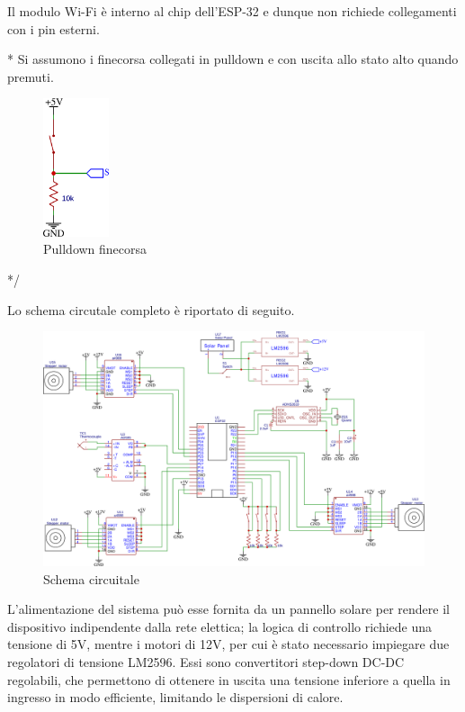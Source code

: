 \documentclass[12pt]{article}
\begin{document}
Il modulo Wi-Fi è interno al chip dell'ESP-32 e dunque non richiede collegamenti con i pin esterni.

\/*
Si assumono i finecorsa collegati in pulldown e con uscita allo stato alto quando premuti.\\

\begin{figure}[h]
\centering
    \includegraphics[width=55pt]{Draws/Pull_down.png}
    \caption{Pulldown finecorsa}
\end{figure}
*/

Lo schema circutale completo è riportato di seguito.
\begin{figure}[h]
\centering
    \includegraphics[width=\textwidth]{Draws/Schematic.png}
    \caption{Schema circuitale}
\end{figure}

L'alimentazione del sistema può esse fornita da un pannello solare per rendere il dispositivo indipendente dalla rete elettica; la logica di controllo richiede una tensione di 5V, mentre i motori di 12V, per cui è stato necessario impiegare due regolatori di tensione LM2596. Essi sono convertitori step-down DC-DC regolabili, che permettono di ottenere in uscita una tensione inferiore a quella in ingresso in modo efficiente, limitando le dispersioni di calore.


\newpage
\end{document}
